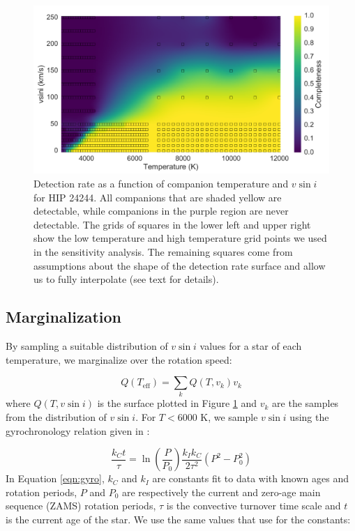 \documentclass{emulateapj}
\begin{document}
\begin{figure}
\includegraphics[width=\columnwidth]{HIP_24244_20130919.pdf}
\caption{Detection rate as a function of companion temperature and $v\sin{i}$ for HIP 24244. All companions that are shaded yellow are detectable, while companions in the purple region are never detectable. The grids of squares in the lower left and upper right show the low temperature and high temperature grid points we used in the sensitivity analysis. The remaining squares come from assumptions about the shape of the detection rate surface and allow us to fully interpolate (see text for details).}
\label{fig:detrate_2d}
\end{figure}

\subsection{Marginalization}
By sampling a suitable distribution of $v\sin{i}$ values for a star of each temperature, we marginalize over the rotation speed:

\begin{equation}
Q(T_\mathrm{eff}) = \sum_k Q(T, v_k) v_k 
\end{equation} 
where $Q(T, v\sin{i})$ is the surface plotted in Figure \ref{fig:detrate_2d} and $v_k$ are the samples from the distribution of $v\sin{i}$. For $T < 6000$ K, we sample $v\sin{i}$ using the gyrochronology relation given in \citet{Barnes2010b}:

\begin{equation}
\frac{k_Ct}{\tau} = \ln\left ( \frac{P}{P_0} \right ) \frac{k_Ik_C}{2\tau^2} (P^2 - P_0^2)
\label{eqn:gyro}
\end{equation}
In Equation \ref{eqn:gyro}, $k_C$ and $k_I$ are constants fit to data with known ages and rotation periods, $P$ and $P_0$ are respectively the current and zero-age main sequence (ZAMS) rotation periods, $\tau$ is the convective turnover time scale and $t$ is the current age of the star. We use the same values that \cite{Barnes2010b} use for the constants:
\end{document}
